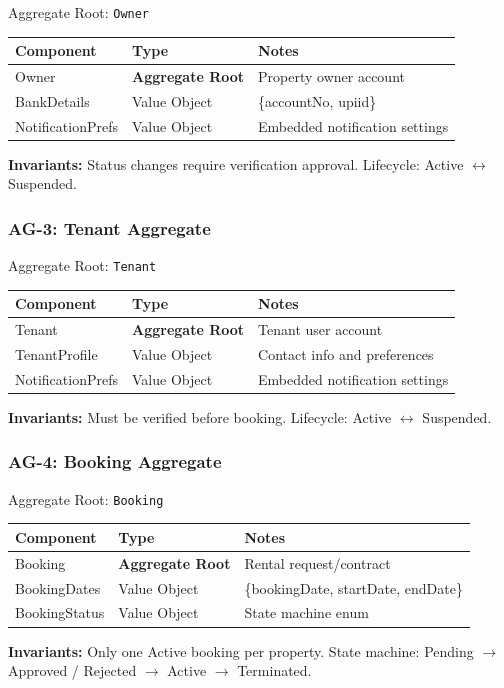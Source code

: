 \documentclass[12pt,a4paper]{article}
\begin{document}
\begin{infobox}{Aggregate Root: \texttt{Owner}}
\begin{tabular}{@{}p{3cm}p{2.8cm}p{7.8cm}@{}}
\textbf{Component} & \textbf{Type} & \textbf{Notes} \\
\hline
Owner & \textbf{Aggregate Root} & Property owner account \\
BankDetails & Value Object & \{accountNo, upiid\} \\
NotificationPrefs & Value Object & Embedded notification settings \\
\end{tabular}

\textbf{Invariants:} Status changes require verification approval. Lifecycle: Active $\leftrightarrow$ Suspended.
\end{infobox}

\subsubsection{AG-3: Tenant Aggregate}

\begin{infobox}{Aggregate Root: \texttt{Tenant}}
\begin{tabular}{@{}p{3cm}p{2.8cm}p{7.8cm}@{}}
\textbf{Component} & \textbf{Type} & \textbf{Notes} \\
\hline
Tenant & \textbf{Aggregate Root} & Tenant user account \\
TenantProfile & Value Object & Contact info and preferences \\
NotificationPrefs & Value Object & Embedded notification settings \\
\end{tabular}

\textbf{Invariants:} Must be verified before booking. Lifecycle: Active $\leftrightarrow$ Suspended.
\end{infobox}

\subsubsection{AG-4: Booking Aggregate}

\begin{infobox}{Aggregate Root: \texttt{Booking}}
\begin{tabular}{@{}p{3cm}p{2.8cm}p{7.8cm}@{}}
\textbf{Component} & \textbf{Type} & \textbf{Notes} \\
\hline
Booking & \textbf{Aggregate Root} & Rental request/contract \\
BookingDates & Value Object & \{bookingDate, startDate, endDate\} \\
BookingStatus & Value Object & State machine enum \\
\end{tabular}

\textbf{Invariants:} Only one Active booking per property. State machine: Pending $\rightarrow$ Approved / Rejected $\rightarrow$ Active $\rightarrow$ Terminated.
\end{infobox}
\end{document}
